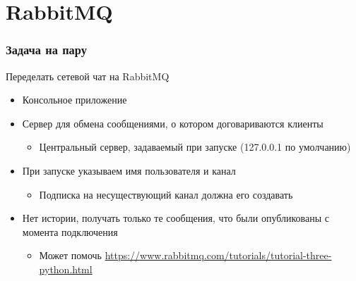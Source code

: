 \documentclass{../../slides-style}
\author[Юрий Литвинов]{Юрий Литвинов \newline \textcolor{gray}{\small\texttt{yurii.litvinov@gmail.com}}}
\begin{document}
	\begin{frame}[plain]
        \titlepage
    \end{frame}

	\section{RabbitMQ}

	\begin{frame}
		\frametitle{Задача на пару}
		Переделать сетевой чат на RabbitMQ
		\begin{itemize}
			\item Консольное приложение
			\item Сервер для обмена сообщениями, о котором договариваются клиенты
			\begin{itemize}
				\item Центральный сервер, задаваемый при запуске (127.0.0.1 по умолчанию)
			\end{itemize}
			\item При запуске указываем имя пользователя и канал
			\begin{itemize}
				\item Подписка на несуществующий канал должна его создавать
			\end{itemize}
			\item Нет истории, получать только те сообщения, что были опубликованы с момента подключения
			\begin{itemize}
				\item Может помочь \url{https://www.rabbitmq.com/tutorials/tutorial-three-python.html}
			\end{itemize}
		\end{itemize}
	\end{frame}
\end{document}
